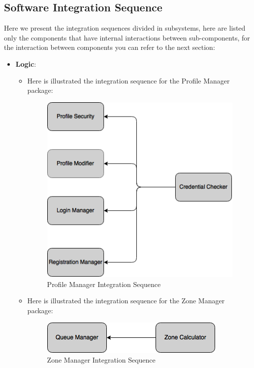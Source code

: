 \documentclass[../../../../../../testPlan.tex]{subfiles}
\begin{document}
	\subsection{Software Integration Sequence}
		Here we present the integration sequences divided in subsystems, here are listed only the components that have internal interactions between sub-components, for the interaction between components you can refer to the next section:
		\begin{itemize}

			\item \textbf{Logic}:
					\begin{itemize}
						\item Here is illustrated the integration sequence for the Profile Manager package:
							\begin{figure}[H]
								\centering
								\includegraphics[width=\textwidth, scale=0.5]{../images/priority_profileManager.png}
							\caption{Profile Manager Integration Sequence}\label{fig:ProfileManagerSequence}
							\end{figure}

						\item Here is illustrated the integration sequence for the Zone Manager package:
							\begin{figure}[H]
								\centering
								\includegraphics[width=\textwidth, scale=0.5]{../images/priority_zoneManager.png}
								\caption{Zone Manager Integration Sequence}\label{fig:ZoneManagerSequence}
							\end{figure}
					\end{itemize}


\end{itemize}
\end{document}
